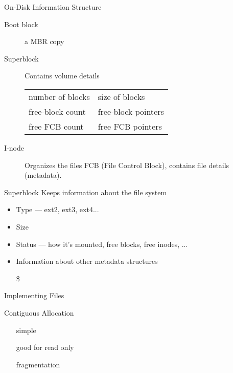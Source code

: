 \begin{frame}{On-Disk Information Structure}
  \begin{description}
  \item[Boot block] a MBR copy
  \item[Superblock] Contains volume details
    \begin{center}
      \begin{tabular}{ll}
        number of blocks& size of blocks\\
        free-block count& free-block pointers\\
        free FCB count& free FCB pointers
      \end{tabular}
    \end{center}
  \item[I-node] Organizes the files \alert{FCB (File Control Block)},
    contains file details (metadata).
  \end{description}
\end{frame}

\begin{frame}
  \begin{block}{Superblock}
    Keeps information about the file system
    \begin{itemize}
    \item Type --- ext2, ext3, ext4...
    \item Size
    \item Status --- how it's mounted, free blocks, free inodes, ...
    \item Information about other metadata structures
    \end{itemize}
  \end{block}
  \begin{itemize}
  \item[\$] 
  \end{itemize}
\end{frame}

\begin{frame}{Implementing Files}
  \begin{center}
  \end{center}
  \begin{block}{Contiguous Allocation}
    \begin{multicols}{2}
      \begin{itemize}
      \item[\Good] simple
      \item[\Good] good for read only
      \item[\Bad] fragmentation
      \end{itemize}
    \end{multicols}
  \end{block}
\end{frame}

